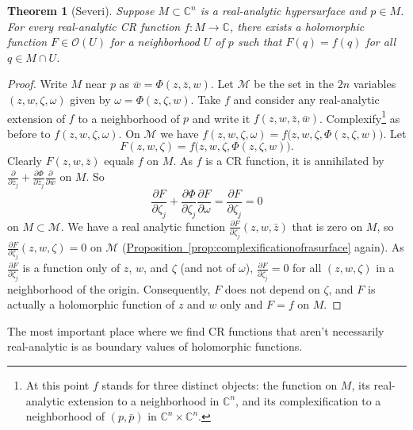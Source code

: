 \documentclass[12pt,openany]{book}
\newcommand{\C}{{\mathbb{C}}}
\newcommand{\sM}{{\mathscr{M}}}
\newcommand{\sO}{{\mathscr{O}}}
\theoremstyle{plain}
\newtheorem{thm}{Theorem}[section]
\theoremstyle{remark}
\theoremstyle{definition}
\theoremstyle{exercise}
\theoremstyle{example}
\newcommand{\propref}[1]{\hyperref[#1]{Proposition~\ref*{#1}}}
\begin{document}
\begin{thm}[Severi] \label{thm:severi}
Suppose $M \subset \C^n$ is a real-analytic hypersurface and $p \in M$.
For every real-analytic CR function $f \colon M \to \C$, there exists
a holomorphic function $F \in \sO(U)$ for a neighborhood $U$ of $p$
such that $F(q) = f(q)$ for all $q \in M \cap U$.
\end{thm}

\begin{proof}
Write $M$ near $p$ as $\bar{w} = \Phi(z,\bar{z},w)$.
Let $\sM$ be the set in the $2n$ variables $(z,w,\zeta,\omega)$ given by
$\omega = \Phi(z,\zeta,w)$.
Take $f$ and consider any real-analytic extension of $f$
to a neighborhood of $p$ and write it
$f(z,w,\bar{z},\bar{w})$.  Complexify\footnote{At this point
$f$ stands for three distinct objects:
the function on $M$, its real-analytic extension to
a neighborhood in $\C^n$, and its complexification
to a neighborhood of $(p,\bar{p})$ in $\C^n \times \C^n$.}
as before to
$f(z,w,\zeta,\omega)$.  On $\sM$ we have
$f(z,w,\zeta,\omega) = f\bigl(z,w,\zeta,\Phi(z,\zeta,w)\bigr)$.  Let
\begin{equation*}
F(z,w,\zeta) = f\bigl(z,w,\zeta,\Phi(z,\zeta,w)\bigr).
\end{equation*}
Clearly $F(z,w,\bar{z})$ equals $f$ on $M$.  
As $f$ is a CR function, it is annihilated by
$\frac{\partial}{\partial \bar{z}_j}
+\frac{\partial \Phi}{\partial \bar{z}_j} \frac{\partial}{\partial
\bar{w}}$ on $M$.  So
\begin{equation*}
\frac{\partial F}{\partial \zeta_j}
+\frac{\partial \Phi}{\partial \zeta_j} \frac{\partial F}{\partial
\omega}
=
\frac{\partial F}{\partial \zeta_j} = 0
\end{equation*}
on $M \subset \sM$.  We have a real analytic function
$\frac{\partial F}{\partial \zeta_j}(z,w,\bar{z})$
that is zero on $M$, so 
$\frac{\partial F}{\partial \zeta_j}(z,w,\zeta) = 0$
on $\sM$
(\propref{prop:complexificationofrasurface} again).
As $\frac{\partial F}{\partial \zeta_j}$ is a function only of
$z$, $w$, and $\zeta$ (and not of $\omega$),
$\frac{\partial F}{\partial \zeta_j} = 0$
for all
$(z,w,\zeta)$ in a neighborhood of the origin.  Consequently,
$F$ does not depend on $\zeta$, and 
$F$ is actually a holomorphic function of $z$ and $w$ only
and $F = f$ on $M$.
\end{proof}

The most important place where we find CR functions that aren't necessarily
real-analytic is as boundary values of holomorphic functions.
\end{document}
